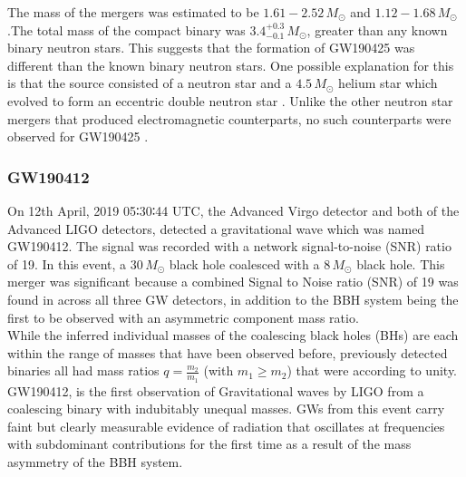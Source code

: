 The mass of the mergers was estimated to be $1.61-2.52\,M_\odot$ and $1.12 - 1.68\,M_\odot$.The total mass of the compact binary was $3.4_{-0.1}^{+0.3}\, M_\odot$, greater than any known binary neutron stars. This suggests that the formation of GW190425 was different than the known binary neutron stars. One possible explanation for this is that the source consisted of a neutron star and a $4.5\,M_\odot$ helium star which evolved to form an eccentric double neutron star \cite{Romero_Shaw_2020}. Unlike the other neutron star mergers that produced electromagnetic counterparts, no such counterparts were observed for GW190425 \cite{GW190425_1}.

\pagebreak

\subsubsection{GW190412}

On 12th April, 2019 05∶30∶44 UTC, the Advanced Virgo detector and both of the Advanced LIGO detectors, detected a gravitational wave which was named GW190412. The signal was recorded with a network signal-to-noise (SNR) ratio of 19. In this event, a $30\, M_\odot$ black hole coalesced with a $8\,M_\odot$ black hole. This merger was significant because a combined Signal to Noise ratio (SNR) of 19 was found in across all three GW detectors, in addition to the BBH system being the first to be observed with an asymmetric component mass ratio.\\

While the inferred individual masses of the coalescing black holes (BHs) are each within the range of masses that have been observed before, previously detected binaries all had mass ratios $ q = \frac{m_2}{m_1}$ (with $m_1 \geq m_2$) that were according to unity. GW190412, is the first observation of Gravitational waves by LIGO from a coalescing binary with indubitably unequal masses. GWs from this event carry faint but clearly measurable evidence of radiation that oscillates at frequencies with subdominant contributions for the first time as a result of the mass asymmetry of the BBH system.

